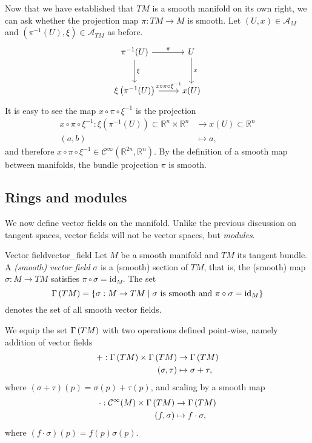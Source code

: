Now that we have established that \(TM\) is a smooth manifold on its own right, we can ask whether the projection map \(\pi : TM \to M\) is smooth. Let \((U, x) \in \mathscr{A}_M\) and \((\pi^{-1}(U), \xi) \in \mathscr{A}_{TM}\) as before.
\begin{equation*}
    \begin{tikzcd}[column sep = normal, row sep = large]
        \pi^{-1}(U) \arrow{d}{\xi} \arrow{r}{\pi} & U \arrow{d}{x}\\
        \xi\left(\pi^{-1}(U)\right) \arrow{r}{x \circ \pi \circ \xi^{-1}} & x(U)
    \end{tikzcd}
\end{equation*}
It is easy to see the map \(x \circ \pi \circ \xi^{-1}\) is the projection
\begin{align*}
    x \circ \pi \circ \xi^{-1} : \xi\left(\pi^{-1}(U)\right)\subset \mathbb{R}^n \times \mathbb{R}^n &\to x(U) \subset \mathbb{R}^n\\
    (a, b) &\mapsto a,
\end{align*}
and therefore \(x \circ \pi \circ \xi^{-1} \in \mathcal{C}^\infty(\mathbb{R}^{2n}, \mathbb{R}^n).\) By the definition of a smooth map between manifolds, the bundle projection \(\pi\) is smooth.

\subsection{Rings and modules}
We now define vector fields on the manifold. Unlike the previous discussion on tangent spaces, vector fields will not be vector spaces, but \emph{modules}.

\begin{definition}{Vector field}{vector_field}
    Let \(M\) be a smooth manifold and \(TM\) its tangent bundle. A \emph{(smooth) vector field} \(\sigma\) is a (smooth) section of \(TM\), that is, the (smooth) map \(\sigma : M \to TM\) satisfies \(\pi \circ \sigma = \mathrm{id}_M\). The set
    \begin{equation*}
        \sections{TM} = \set*{\sigma : M \to TM\;|\; \sigma \text{ is smooth and } \pi \circ \sigma = \mathrm{id}_M}
    \end{equation*}
    denotes the set of all smooth vector fields.
\end{definition}

We equip the set \(\sections{TM}\) with two operations defined point-wise, namely addition of vector fields
\begin{align*}
    + : \sections{TM} \times \sections{TM} &\to \sections{TM}\\
    (\sigma, \tau) &\mapsto \sigma+\tau,
\end{align*}
where \((\sigma+\tau)(p) = \sigma(p) + \tau(p)\), and scaling by a smooth map
\begin{align*}
    \cdot : \smooth{M} \times \sections{TM} &\to \sections{TM}\\
    (f, \sigma)  &\mapsto f\cdot\sigma,
\end{align*}
where \((f\cdot \sigma)(p) = f(p) \sigma(p).\)

